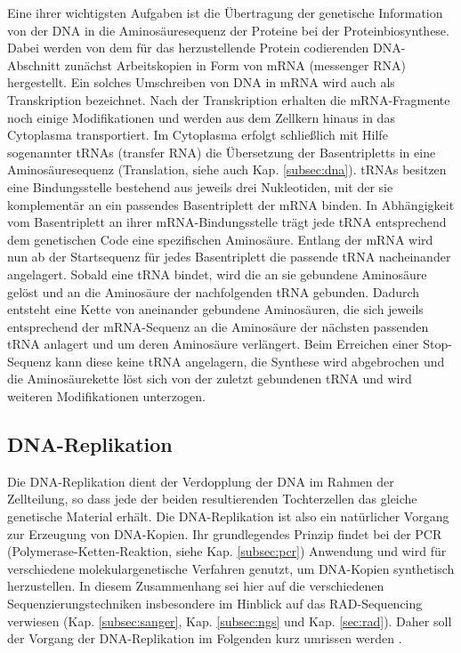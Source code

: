 Eine ihrer wichtigsten Aufgaben ist die Übertragung der genetische Information von der DNA in die Aminosäuresequenz der Proteine bei der Proteinbiosynthese. Dabei werden von dem für das herzustellende Protein codierenden DNA-Abschnitt zunächst Arbeitskopien in Form von mRNA (messenger RNA) hergestellt. Ein solches Umschreiben von DNA in mRNA wird auch als Transkription bezeichnet. Nach der Transkription erhalten die mRNA-Fragmente noch einige Modifikationen und werden aus dem Zellkern hinaus in das Cytoplasma transportiert. Im Cytoplasma erfolgt schließlich mit Hilfe sogenannter tRNAs (transfer RNA) die Übersetzung der Basentripletts in eine Aminosäuresequenz (Translation, siehe auch Kap. \ref{subsec:dna}). tRNAs besitzen eine Bindungsstelle bestehend aus jeweils drei Nukleotiden, mit der sie komplementär an ein passendes Basentriplett der mRNA binden. In Abhängigkeit vom Basentriplett an ihrer mRNA-Bindungsstelle trägt jede tRNA entsprechend dem genetischen Code eine spezifischen Aminosäure. Entlang der mRNA wird nun ab der Startsequenz für jedes Basentriplett die passende tRNA nacheinander angelagert. Sobald eine tRNA bindet, wird die an sie gebundene Aminosäure gelöst und an die Aminosäure der nachfolgenden tRNA gebunden. Dadurch entsteht eine Kette von aneinander gebundene Aminosäuren, die sich jeweils entsprechend der mRNA-Sequenz an die Aminosäure der nächsten passenden tRNA anlagert und um deren Aminosäure verlängert. Beim Erreichen einer Stop-Sequenz kann diese keine tRNA angelagern, die Synthese wird abgebrochen und die Aminosäurekette löst sich von der zuletzt gebundenen tRNA und wird weiteren Modifikationen unterzogen. \\

\subsection{DNA-Replikation} \label{subsec:replication}

Die DNA-Replikation dient der Verdopplung der DNA im Rahmen der Zellteilung, so dass jede der beiden resultierenden Tochterzellen das gleiche genetische Material erhält. Die DNA-Replikation ist also ein natürlicher Vorgang zur Erzeugung von DNA-Kopien. Ihr grundlegendes Prinzip findet bei der PCR (Polymerase-Ketten-Reaktion, siehe Kap. \ref{subsec:pcr}) Anwendung und wird für verschiedene molekulargenetische Verfahren genutzt, um DNA-Kopien synthetisch herzustellen. In diesem Zusammenhang sei hier auf die verschiedenen Sequenzierungstechniken insbesondere im Hinblick auf das RAD-Sequencing verwiesen (Kap. \ref{subsec:sanger}, Kap. \ref{subsec:ngs} und Kap. \ref{sec:rad}). Daher soll der Vorgang der DNA-Replikation im Folgenden kurz umrissen werden \cite{odonell_2013, chargin_2010, prioleau_2016}. \\


